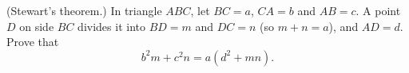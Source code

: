(Stewart's theorem.) In triangle $ABC$, let $BC=a$, $CA=b$ and $AB=c$. A point $D$ on side $BC$ divides it into $BD=m$ and $DC=n$ (so $m+n=a$), and $AD=d$. Prove that
\[b^2m+c^2n=a\left(d^2+mn\right).\]

